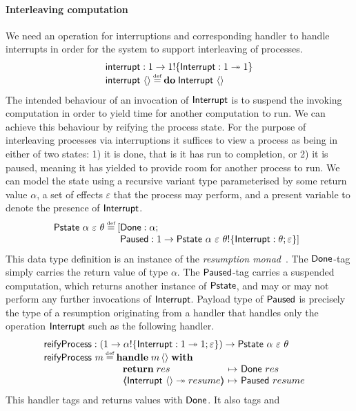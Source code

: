 \documentclass[12pt,phd,lfcs,twoside,openright,logo,leftchapter,normalheadings]{infthesis}
\theoremstyle{plain}
\theoremstyle{definition}
\begin{document}
\paragraph{Interleaving computation}
%
We need an operation for interruptions and corresponding handler to
handle interrupts in order for the system to support interleaving of
processes.
%
\[
  \bl
    \interrupt : \UnitType \to \UnitType \eff \{\Interrupt : \UnitType \opto \UnitType\}\\
    \interrupt~\Unit \defas \Do\;\Interrupt~\Unit
  \el
\]
%
The intended behaviour of an invocation of $\mathsf{Interrupt}$ is to suspend
the invoking computation in order to yield time for another
computation to run.
%
We can achieve this behaviour by reifying the process state. For the
purpose of interleaving processes via interruptions it suffices to
view a process as being in either of two states: 1) it is done, that
is it has run to completion, or 2) it is paused, meaning it has
yielded to provide room for another process to run.
%
We can model the state using a recursive variant type parameterised by
some return value $\alpha$, a set of effects $\varepsilon$ that the
process may perform, and a present variable to denote the presence of
$\mathsf{Interrupt}$.
%
\[
  \Pstate~\alpha~\varepsilon~\theta \defas
    \ba[t]{@{}l@{}l}
       [&\Done:\alpha;\\
        &\Suspended:\UnitType \to \Pstate~\alpha~\varepsilon~\theta \eff \{\Interrupt:\theta;\varepsilon\} ]
     \ea
\]
%
This data type definition is an instance of the \emph{resumption
  monad}~\cite{Papaspyrou01}. The $\mathsf{Done}$-tag simply carries the
return value of type $\alpha$. The $\mathsf{Paused}$-tag carries a
suspended computation, which returns another instance of $\mathsf{Pstate}$,
and may or may not perform any further invocations of
$\mathsf{Interrupt}$. Payload type of $\mathsf{Paused}$ is precisely the type of a
resumption originating from a handler that handles only the operation
$\mathsf{Interrupt}$ such as the following handler.
%
\[
  \bl
    \reifyP : (\UnitType \to \alpha \eff \{\Interrupt: \UnitType \opto \UnitType;\varepsilon\}) \to \Pstate~\alpha~\varepsilon~\theta\\
    \reifyP~m \defas
         \ba[t]{@{}l}
           \Handle\;m\,\Unit\;\With\\
             ~\ba{@{~}l@{~}c@{~}l}
                \Return\;res &\mapsto& \Done~res\\
                \OpCase{\Interrupt}{\Unit}{resume} &\mapsto& \Suspended~resume
              \ea
         \ea
  \el
\]
%
This handler tags and returns values with $\mathsf{Done}$. It also tags and
\end{document}
